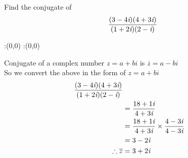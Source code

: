 



\question  Find the conjugate of 
\begin{align}
\dfrac{(3-4 \textit{i})(4 +3 \textit{i})}{(1+2\textit{i})(2-\textit{i})} 
\end{align}


\watchout

\ifprintanswers
  \begin{marginfigure}
      :(0,0)
      :(0,0)
    \figdrawbegin{}
      \figdrawline [100,101]
    \figdrawend
    \figvisu{\figBoxA}{}{%
    }
    \centerline{\box\figBoxA}
  \end{marginfigure}
\fi 

\begin{solution}
Conjugate of a complex number $z = a + b\textit{i}$ is $\overline{z} = a - b\textit{i} $ \\
So we convert the above in the form of $z = a + b\textit{i}$ \\ 
	\begin{align}
  		\dfrac{(3-4 \textit{i})(4 + 3 \textit{i})}{(1+2\textit{i})(2-\textit{i})} \\
		&= \dfrac{18 + 1 \textit{i} }{4 + 3 \textit{i}} \\
		&= \dfrac{18 + 1 \textit{i}}{4 + 3 \textit{i}} \times \dfrac{4 - 3 \textit{i}}{4 - 3 \textit{i}} \\
		&= 3 - 2 \textit{i}  \\
		\therefore \overline{z} &= 3 + 2 \textit{i} 
	\end{align}
\end{solution}


